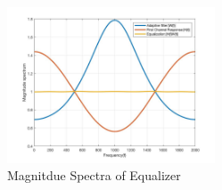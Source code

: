 \documentclass[journal]{IEEEtran}
\begin{document}
\begin{figure}[H]
  \centering
  \captionsetup{justification=centering}
  \includegraphics[width=0.55\textwidth, inner] {Plots/Project2_MagnitudeSpectrum.jpg}
  \caption{Magnitdue Spectra of Equalizer}
    \label{fig:magspec}
\end{figure}
%
%

\end{document}
